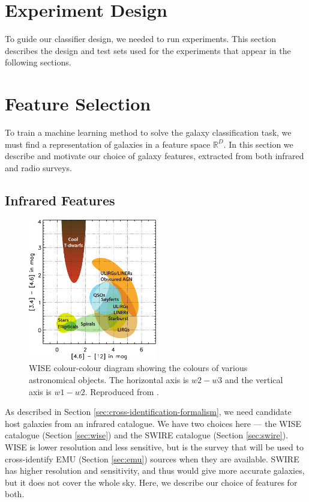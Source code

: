 \section{Experiment Design}
\label{sec:experiment-design}

  To guide our classifier design, we needed to run experiments. This section
  describes the design and test sets used for the experiments that appear in the
  following sections.


\section{Feature Selection}
\label{sec:features}

  To train a machine learning method to solve the galaxy classification task,
  we must find a representation of galaxies in a feature space $\mathbb{R}^D$.
  In this section we describe and motivate our choice of galaxy features,
  extracted from both infrared and radio surveys.

  \subsection{Infrared Features}
  \label{sec:ir-features}

    \begin{figure}
      \centering
      \includegraphics[width=0.5\textwidth]{images/wise_colour-colour}
      \caption{WISE colour-colour diagram showing the colours of various
        astronomical objects. The horizontal axis is $w2 - w3$ and the vertical
        axis is $w1 - w2$. Reproduced from \citep{wright10}.}
      \label{fig:wise-colour-colour}
    \end{figure}

    As described in Section \ref{sec:cross-identification-formalism}, we need
    candidate host galaxies from an infrared catalogue. We have two choices here
    --- the WISE catalogue (Section \ref{sec:wise}) and the SWIRE catalogue
    (Section \ref{sec:swire}). WISE is lower resolution and less sensitive, but
    is the survey that will be used to cross-identify EMU (Section
    \ref{sec:emu}) sources when they are available. SWIRE has higher
    resolution and sensitivity, and thus would give more accurate galaxies, but
    it does not cover the whole sky. Here, we describe our choice of features
    for both.


